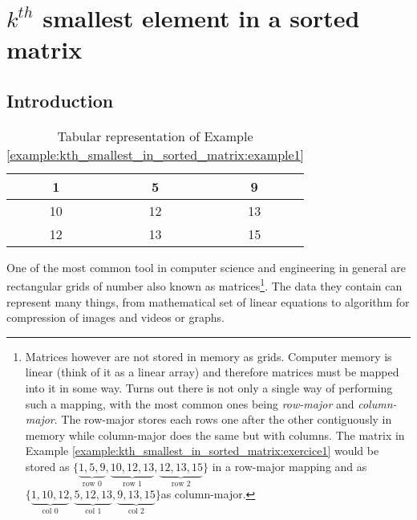 %



\chapter{$k^{th}$ smallest element in a sorted matrix}
\label{ch:kth_smallest_in_sorted_matrix}
\section*{Introduction}
\begin{wraptable}{r}{4.5cm}
	\centering
	\begin{framed}  
	\begin{tabular}{|c|c|c|}
	\hline
	1  & 5  & 9  \\ \hline
	10 & 12 & 13 \\ \hline
	12 & 13 & 15 \\ \hline
\end{tabular}%
\caption{Tabular representation of Example \ref{example:kth_smallest_in_sorted_matrix:example1}}
\label{tab:kth_smallest_in_sorted_matrix:example1}
\end{framed}
\end{wraptable} 

One of the most common tool in computer science and engineering in general are rectangular grids of number also known as matrices\footnote{Matrices however are not stored in memory as grids. Computer memory is linear (think of it as a linear array) and therefore matrices must be mapped into it in some way. Turns out there is not only a single way of performing such a mapping, with the most common ones being \textit{row-major} and \textit{column-major}. The row-major stores each rows one after the other contiguously in memory  while column-major does the same but with columns. The matrix in Example \ref{example:kth_smallest_in_sorted_matrix:exercice1} would be stored as $\{\underbrace{1,5,9}_{\text{row 0}},\underbrace{10,12,13}_{\text{row 1}},\underbrace{12,13,15}_{\text{row 2}}\}$ in a row-major mapping and as $\{\underbrace{1,10,12}_{\text{col 0}},\underbrace{5,12,13}_{\text{col 1}},\underbrace{9,13,15}_{\text{col 2}}\}$as column-major.}. The data they  contain can represent many things, from mathematical set of linear equations to algorithm for compression of images and videos or graphs.

